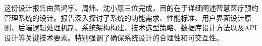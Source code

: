 这份设计报告由黄鸿宇、周炜、沈小康三位完成，目的在于详细阐述智慧医疗预约管理系统的设计。报告深入探讨了系统的功能需求、性能标准、用户界面设计原则、后端逻辑处理机制、系统架构构建、技术选型策略、数据库设计方法以及API设计等关键技术要素。特别强调了确保系统设计的合理性和可交互性。